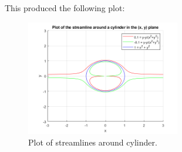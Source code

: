 \documentclass[11pt]{article}
\begin{document}

This produced the following plot:
\begin{figure}[H]
  \centering
  \includegraphics[width = 0.6\textwidth]{./img/diagram16.png}
  \caption{Plot of streamlines around cylinder.}
\end{figure} 
\end{document}
